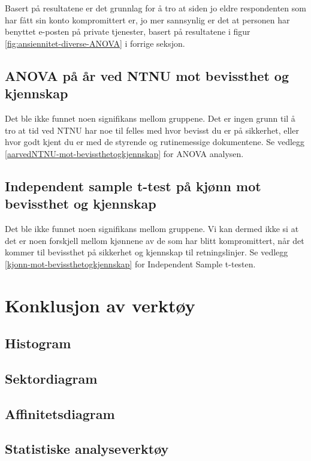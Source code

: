 Basert på resultatene er det grunnlag for å tro at siden jo eldre respondenten som har fått sin konto kompromittert er, jo mer sannsynlig er det at personen har benyttet e-posten på private tjenester, basert på resultatene i figur \ref{fig:ansiennitet-diverse-ANOVA} i forrige seksjon.

\subsection{ANOVA på år ved NTNU mot bevissthet og kjennskap}
Det ble ikke funnet noen signifikans mellom gruppene. Det er ingen grunn til å tro at tid ved NTNU har noe til felles med hvor bevisst du er på sikkerhet, eller hvor godt kjent du er med de styrende og rutinemessige dokumentene. Se vedlegg \ref{aarvedNTNU-mot-bevissthetogkjennskap} for ANOVA analysen.


\subsection{Independent sample t-test på kjønn mot bevissthet og kjennskap}
Det ble ikke funnet noen signifikans mellom gruppene. Vi kan dermed ikke si at det er noen forskjell mellom kjønnene av de som har blitt kompromittert, når det kommer til bevissthet på sikkerhet og kjennskap til retningslinjer. Se vedlegg \ref{kjonn-mot-bevissthetogkjennskap} for Independent Sample t-testen. 



\section{Konklusjon av verktøy}


\subsection{Histogram}


\subsection{Sektordiagram}


\subsection{Affinitetsdiagram}


\subsection{Statistiske analyseverktøy}
